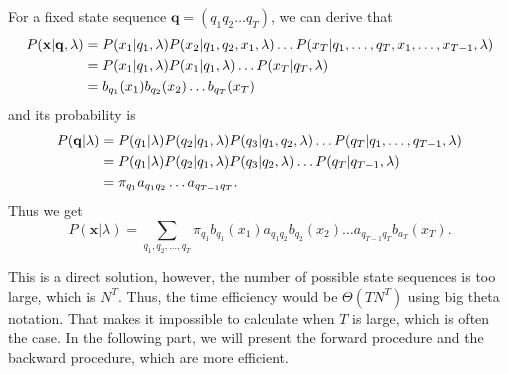 \documentclass[12pt,final,twoside]{report}
\theoremstyle{plain}
\theoremstyle{definition}
\theoremstyle{remark}
\begin{document}
For a fixed state sequence $\mathbf{q} = (q_1 q_2 \dots q_T)$, we can derive that
\begin{align}
  P(\mathbf{x}|\mathbf{q},\lambda) &= P(x_1|q_1,\lambda) P(x_2|q_1,q_2,x_1,\lambda) \dots P(x_T|q_1,\dots,q_T,x_1,\dots,x_{T-1},\lambda) \notag\\
  &= P(x_1|q_1, \lambda) P(x_1|q_1, \lambda) \dots P(x_T|q_T, \lambda) \notag\\
  &= b_{q_1}(x_1) b_{q_2}(x_2) \dots b_{q_T}(x_T)
\end{align}
and its probability is
\begin{align}
  P(\mathbf{q}|\lambda) &= P(q_1|\lambda) P(q_2|q_1,\lambda) P(q_3|q_1,q_2,\lambda) \dots P(q_T|q_1,\dots,q_{T-1},\lambda) \notag\\
  &= P(q_1|\lambda) P(q_2|q_1,\lambda) P(q_3|q_2,\lambda) \dots P(q_T|q_{T-1},\lambda)  \notag\\
  &= \pi_{q_1} a_{q_1q_2} \dots a_{q_{T-1}q_T} .
\end{align}
Thus we get 
\begin{equation}
  P(\mathbf{x}|\lambda) = \sum_{q_1,q_2,\dots,q_T} \pi_{q_1} b_{q_1}(x_1) a_{q_1q_2} b_{q_2}(x_2) \dots a_{q_{T-1}q_T} b_{a_T}(x_T) .
  \label{eq:prob_brute}
\end{equation}

This is a direct solution, however, the number of possible state sequences is too large, which is $N^T$. Thus, the time efficiency would be $\Theta(T N^T)$ using big theta notation. That makes it impossible to calculate when $T$ is large, which is often the case. In the following part, we will present the forward procedure and the backward procedure, which are more efficient.
\end{document}
